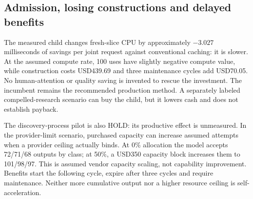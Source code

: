 \subsection{Admission, losing constructions and delayed benefits}
The measured child changes fresh-slice CPU by approximately $-3.027$ milliseconds of savings per joint request against conventional caching: it is slower. At the assumed compute rate, 100 uses have slightly negative compute value, while construction costs USD439.69 and three maintenance cycles add USD70.05. No human-attention or quality saving is invented to rescue the investment. The incumbent remains the recommended production method. A separately labeled compelled-research scenario can buy the child, but it lowers cash and does not establish payback.

The discovery-process pilot is also HOLD: its productive effect is unmeasured. In the provider-limit scenario, purchased capacity can increase assumed attempts when a provider ceiling actually binds. At 0\% allocation the model accepts 72/71/68 outputs by class; at 50\%, a USD350 capacity block increases them to 101/98/97. This is assumed vendor capacity scaling, not capability improvement. Benefits start the following cycle, expire after three cycles and require maintenance. Neither more cumulative output nor a higher resource ceiling is self-acceleration.


